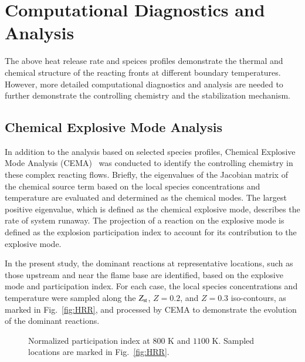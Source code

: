 \documentclass[review,3p,times]{elsarticle}
\begin{document}
\section{Computational Diagnostics and Analysis}
The above heat release rate and speices profiles demonstrate the thermal and chemical structure of the reacting fronts at different boundary temperatures.  However, more detailed computational diagnostics and analysis are needed to further demonstrate the controlling chemistry and the stabilization mechanism.
\subsection{Chemical Explosive Mode Analysis}
In addition to the analysis based on selected species profiles, Chemical Explosive Mode Analysis (CEMA)~\cite{lu10,shan12} was conducted to identify the controlling chemistry in these complex reacting flows.  Briefly, the eigenvalues of the Jacobian matrix of the chemical source term based on the local species concentrations and temperature are evaluated and determined as the chemical modes.  The largest positive eigenvalue, which is defined as the chemical explosive mode, describes the rate of system runaway.  The projection of a reaction on the explosive mode is defined as the explosion participation index to account for its contribution to the explosive mode.  

In the present study, the dominant reactions at representative locations, such as those upstream and near the flame base are identified, based on the explosive mode and participation index.  For each case, the local species concentrations and temperature were sampled along the $Z_{\rm st}$, $Z = 0.2$, and $Z = 0.3$ iso-contours, as marked in Fig.~\ref{fig:HRR}, and processed by CEMA to demonstrate the evolution of the dominant reactions.

\begin{figure}
  \centering
  \scriptsize
  
  
  \normalsize
  \caption{Normalized participation index at $800$ K and $1100$ K.  Sampled locations are marked in Fig.~\ref{fig:HRR}.}
  \label{fig:CEMA}
\end{figure}
\end{document}
